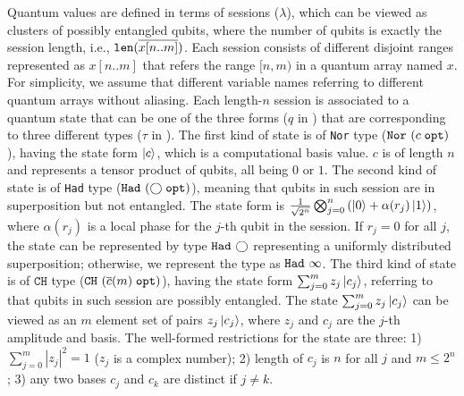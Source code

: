 Quantum values are defined in terms of sessions ($\lambda$), which can be viewed as clusters of possibly entangled qubits, where the number of qubits is exactly the session length, i.e., $\texttt{len}(\overline{x[n..m]})$.
Each session consists of different disjoint ranges represented as $x[n..m]$ that refers the range $[n,m)$ in a quantum array named $x$.
For simplicity, we assume that different variable names referring to different quantum arrays without aliasing.
Each length-$n$ session is associated to a quantum state that can be one of the three forms ($q$ in ) that are corresponding to three different types ($\tau$ in ). The first kind of state is of \texttt{Nor} type ($\texttt{Nor}~{(c\;\texttt{opt})}$), having the state form $\left\vert{c}\right\rangle$, which is a computational basis value. $c$ is of length $n$ and represents a tensor product of qubits, all being $0$ or $1$. The second kind of state is of \texttt{Had} type ($\texttt{Had}~{(\bigcirc\;\texttt{opt})}$),  meaning that qubits in such session are in superposition but not entangled.
The state form is $\frac{1}{\sqrt{2^n}}\bigotimes_{j=0}^{n}{(\left\vert{0}\right\rangle+\alpha(r_j)\left\vert{1}\right\rangle)}$, where $\alpha(r_j)$ is a local phase for the $j$-th qubit in the session. If $r_j=0$ for all $j$, the state can be represented by  type $\texttt{Had}~{\bigcirc}$ representing a uniformly distributed superposition; otherwise, we represent the type as $\texttt{Had}~{\infty}$. The third kind of state is of $\texttt{CH}$ type ($\texttt{CH}~{(\overline{c}(m)\;\texttt{opt})}$), having the state form $\sum_{j=0}^{m}{z_j\left\vert{c_j}\right\rangle}$, referring to that qubits in such session are possibly entangled. The state $\sum_{j=0}^{m}{z_j\left\vert{c_j}\right\rangle}$ can be viewed as an $m$ element set of pairs $z_j\left\vert{c_j}\right\rangle$, where $z_j$ and $c_j$ are the $j$-th amplitude and basis.
The well-formed restrictions for the state are three: 1) $\sum_{j=0}^{m}|z_j|^2=1$ ($z_j$ is a complex number); 2) length of $c_j$ is $n$ for all $j$ and $m \le 2^n$; 3) any two bases $c_j$ and $c_k$ are distinct if $j \neq k$.


